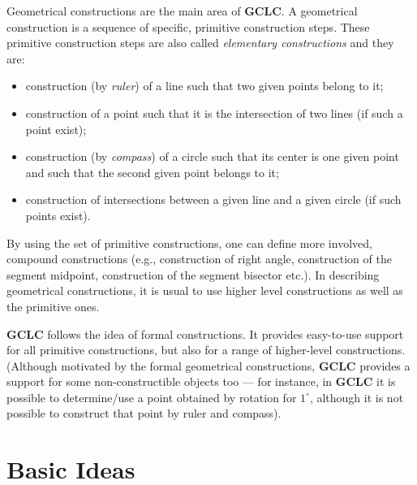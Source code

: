 \documentclass[a4paper]{book}
\newcommand{\gclc}{{\bfseries GCLC}\xspace}
\begin{document}
Geometrical constructions are the main area of \gclc.
A geometrical construction is a sequence of specific, primitive
construction steps. These primitive construction steps are also
called {\em elementary constructions\/} and they are:

\begin{itemize}
\item construction (by {\em ruler}) of a line such that two given
points belong to it;
\item construction of a point such that it is the intersection of
two lines (if such a point exist);
\item construction (by {\em compass}) of a circle such that its center
is one given point and such that the second given point belongs to it;
\item construction of intersections between a given line and a given 
circle (if such points exist).
\end{itemize}

By using the set of primitive constructions, one can define more
involved, compound constructions (e.g., construction of right angle,
construction of the segment midpoint, construction of the segment
bisector etc.). In describing geometrical constructions, it is usual
to use higher level constructions as well as the primitive ones.

\gclc follows the idea of formal constructions. It provides
easy-to-use support for all primitive constructions, but also for
a range of higher-level constructions. (Although motivated by the
formal geometrical constructions, \gclc provides a support for
some non-constructible objects too --- for instance, in \gclc it is
possible to determine/use a point obtained by rotation for
$1^\circ$, although it is not possible to construct that point
by ruler and compass).


\section{Basic Ideas}
\end{document}
